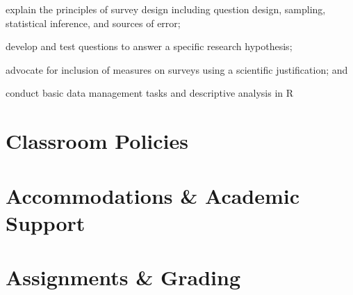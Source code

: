 \documentclass[11pt]{syllabus}
\begin{document}
\begin{objectives}
\item explain the principles of survey design including question design, sampling, statistical inference, and sources of error;
\item develop and test questions to answer a specific research hypothesis; 
\item advocate for inclusion of measures on surveys using a scientific justification; and
\item conduct basic data management tasks and descriptive analysis in \textsf{R}
\end{objectives}

\section{Classroom Policies}
\showpolicies

\section{Accommodations \& Academic Support}
\showresources

\section{Assignments \& Grading}
\end{document}
